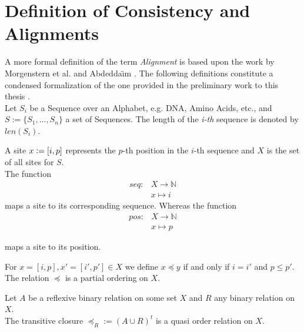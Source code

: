 \section{Definition of Consistency and Alignments}
A more formal definition of the term \textit{Alignment} is based upon the work by Morgenstern et al. \cite{morgenstern1996multiple} and Abdedda{\"\i}m \cite{abdeddaim2000speeding}. The following definitions constitute a condensed formalization of the one provided in the preliminary work to this thesis \cite{hundt2020praktkium}.\\ 

Let $S_i$ be a Sequence over an Alphabet, e.g. DNA, Amino Acids, etc., and $S := \{S_1, ..., S_n\}$ a set of Sequences. The length of the \textit{i-th} sequence is denoted by $len(S_i)$.\\

\begin{mydef}[Site]
	A site $x \vcentcolon= [i,p]$ represents the $p$-th position in the $i$-th sequence and $X$ is the set of all sites for $S$.\\
	The function 
	\begin{align*}
	seq: &X \rightarrow \mathbb{N}\\
	&x \mapsto i
	\end{align*}
	maps a site to its corresponding sequence. Whereas the function
	\begin{align*}
	pos: &X \rightarrow \mathbb{N}\\
	&x \mapsto p
	\end{align*}
\end{mydef}
maps a site to its position.
\begin{mydef}
	For $x = [i, p], x'=[i', p'] \in X$ we define $x \preceq y$ if and only if $i = i'$ and $p \leq p'$.\\
	The relation $\preceq$ is a partial ordering on $X$.
\end{mydef}


\begin{mylemma}
	Let $A$ be a reflexive binary relation on some set $X$ and $R$ any binary relation on $X$.\\
	The transitive closure $\preceq_R :=(A\cup R)^t$ is a quasi order relation on $X$.\\
	\label{lem:extension-quasiorder}
\end{mylemma}

